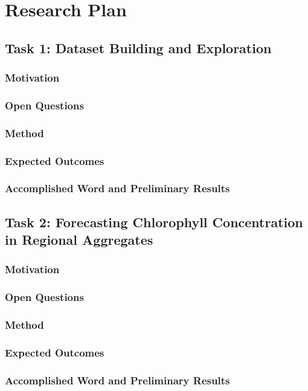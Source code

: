 \chapter{Research Plan}

\section{Task 1: Dataset Building and Exploration}

\subsection{Motivation}
\subsection{Open Questions}
\subsection{Method}
\subsection{Expected Outcomes}
\subsection{Accomplished Word and Preliminary Results}

\section{Task 2: Forecasting Chlorophyll Concentration in Regional Aggregates}

\subsection{Motivation}
\subsection{Open Questions}
\subsection{Method}
\subsection{Expected Outcomes}
\subsection{Accomplished Word and Preliminary Results}

